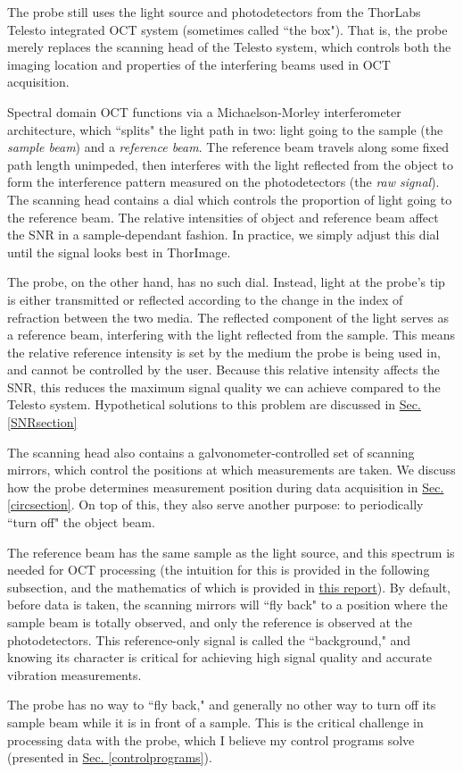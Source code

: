 \documentclass{article}
\begin{document}
\par{The probe still uses the light source and photodetectors from the ThorLabs Telesto integrated OCT system (sometimes called ``the box"). That is, the probe merely replaces the scanning head of the Telesto system, which controls both the imaging location and properties of the interfering beams used in OCT acquisition.}
\par{Spectral domain OCT functions via a Michaelson-Morley interferometer architecture, which ``splits" the light path in two: light going to the sample (the \textit{sample beam}) and a \textit{reference beam}. The reference beam travels along some fixed path length unimpeded, then interferes with the light reflected from the object to form the interference pattern measured on the photodetectors (the \textit{raw signal}). The scanning head contains a dial which controls the proportion of light going to the reference beam. The relative intensities of object and reference beam affect the SNR in a sample-dependant fashion. In practice, we simply adjust this dial until the signal looks best in ThorImage.}
\par{The probe, on the other hand, has no such dial. Instead, light at the probe's tip is either transmitted or reflected according to the change in the index of refraction between the two media. The reflected component of the light serves as a reference beam, interfering with the light reflected from the sample. This means the relative reference intensity is set by the medium the probe is being used in, and cannot be controlled by the user. Because this relative intensity affects the SNR, this reduces the maximum signal quality we can achieve compared to the Telesto system. Hypothetical solutions to this problem are discussed in \hyperlink{SNRsection}{Sec. \ref{SNRsection}}}
\par{The scanning head also contains a galvonometer-controlled set of scanning mirrors, which control the positions at which measurements are taken. We discuss how the probe determines measurement position during data acquisition in \hyperlink{circsection}{Sec. \ref{circsection}}. On top of this, they also serve another purpose: to periodically ``turn off" the object beam.}
\par{The reference beam has the same sample as the light source, and this spectrum is needed for OCT processing (the intuition for this is provided in the following subsection, and the mathematics of which is provided in \href{https://github.com/Brian-Frost-LaPlante/LabReports/blob/main/ProbeReports/Fixed-BackgroundProcessing.pdf}{this report}). By default, before data is taken, the scanning mirrors will ``fly back" to a position where the sample beam is totally observed, and only the reference is observed at the photodetectors. This reference-only signal is called the ``background," and knowing its character is critical for achieving high signal quality and accurate vibration measurements.}
\par{The probe has no way to ``fly back," and generally no other way to turn off its sample beam while it is in front of a sample. This is the critical challenge in processing data with the probe, which I believe my control programs solve (presented in \hyperlink{controlprograms}{Sec. \ref{controlprograms}}).}
\end{document}
